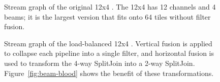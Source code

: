 \begin{figure}
\centering
{}
\caption{\protect\small Stream graph of the original 12x4 \BeamFormer.  The 12x4 \BeamFormer has 12 channels and 4 beams; it is the largest version that fits onto 64 tiles without filter fusion.  \protect\label{fig:beam-orig}}
\vspace{36pt}
\caption{\protect\small Stream graph of the load-balanced 12x4 \BeamFormer.  Vertical fusion is applied to collapse each pipeline into a single filter, and horizontal fusion is used to transform the 4-way SplitJoin into a 2-way SplitJoin.
Figure~\ref{fig:beam-blood} shows the benefit of these
transformations. \protect\label{fig:beam-opt}}
\end{figure}
